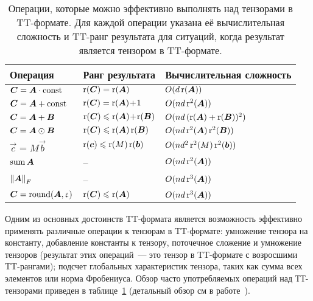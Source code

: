\begin{table}[t]
\caption{Операции, которые можно эффективно выполнять над тензорами в TT\hyp{}формате. Для каждой операции указана её вычислительная сложность и TT\hyp{}ранг результата для ситуаций, когда результат является тензором в TT\hyp{}формате.}
\label{TT-tensor-operations}
\vskip 0.05in
\begin{center}
\begin{small}
\begin{tabular}{l@{\;\;}l@{\;\;}l}
\hline
Операция & Ранг результата & Вычислительная сложность \\
\hline
$\boldsymbol{C} = \boldsymbol{A} \cdot \operatorname{const}$      & $\operatorname{r}(\boldsymbol{C}) = \operatorname{r}(\boldsymbol{A})$             & $O(d  \operatorname{r}(\boldsymbol{A}))$\\
$\boldsymbol{C} = \boldsymbol{A} + \operatorname{const}$          & $\operatorname{r}(\boldsymbol{C}) = \operatorname{r}(\boldsymbol{A})\!+\!1$         & $O(n  d  \operatorname{r}^2(\boldsymbol{A}))$\\
$\boldsymbol{C} = \boldsymbol{A} + \boldsymbol{B}$           & $\operatorname{r}(\boldsymbol{C}) \leqslant \operatorname{r}(\boldsymbol{A})\!+\!\operatorname{r}(\boldsymbol{B})$       & $O(n  d \, (\operatorname{r}(\boldsymbol{A}) + \operatorname{r}(\boldsymbol{B}))^2)$\\
$\boldsymbol{C} = \boldsymbol{A} \odot \boldsymbol{B}$       & $\operatorname{r}(\boldsymbol{C}) \leqslant \operatorname{r}(\boldsymbol{A})  \operatorname{r}(\boldsymbol{B})$   & $O(n  d  \operatorname{r}^2(\boldsymbol{A})  \operatorname{r}^2(\boldsymbol{B}))$\\
$\vec{c}=M\vec{b}$                          & $\operatorname{r}(\boldsymbol{c}) \leqslant \operatorname{r}(M) \operatorname{r}(\boldsymbol{b})$       & $O(n d^2 \operatorname{r}^2(M) \operatorname{r}^2(\boldsymbol{b}))$\\
$\operatorname{sum} \boldsymbol{A}$                & --                      & $O(n  d  \operatorname{r}^2(\boldsymbol{A}))$\\
$\left \| \boldsymbol{A} \right \|_F$       & --                      & $O(n  d  \operatorname{r}^3(\boldsymbol{A}))$\\
$\boldsymbol{C} = \operatorname{round}(\boldsymbol{A}, \upvarepsilon)$ & $\operatorname{r}(\boldsymbol{C}) \leqslant \operatorname{r}(\boldsymbol{A})$          & $O(n d \operatorname{r}^3(\boldsymbol{A}))$\\
\hline
\end{tabular}
\end{small}
\end{center}
\vskip -0.1in
\end{table}

Одним из основных достоинств TT\hyp{}формата является возможность эффективно применять различные операции к тензорам в TT\hyp{}формате:
умножение тензора на константу, добавление константы к тензору, поточечное сложение и умножение тензоров (результат этих операций~--- это тензор в TT\hyp{}формате с возросшими TT\hyp{}рангами); подсчет глобальных характеристик тензора, таких как сумма всех элементов или норма Фробениуса. Обзор часто употребляемых операций над ТТ-тензорами приведен в таблице~\ref{TT-tensor-operations} (детальный обзор см в работе~\cite{oseledets2011ttMain}).


